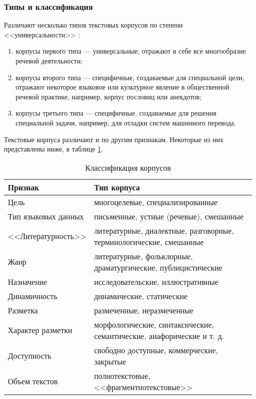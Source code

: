 \subsubsection{Типы и классификация}

Различают несколько типов текстовых корпусов по степени <<универсальности>> \cite{kl}:
\begin{enumerate}
    \item корпусы первого типа --- универсальные, отражают в себе все многообразие речевой деятельности;
    \item корпусы второго типа --- специфичные, создаваемые для специальной цели, отражают некоторое языковое или культурное явление в общественной речевой практике, например, корпус пословиц или анекдотов;
    \item корпусы третьего типа --- специфичные, создаваемые для решения специальной задачи, например, для отладки систем машинного перевода.
\end{enumerate}

Текстовые корпуса различают и по другим признакам.
Некоторые из них представлены ниже, в таблице \ref{tab:coc}.
\begin{table}[H]
\centering
        \caption{Классификация корпусов \cite[с. 16]{kl}}
		\label{tab:coc}
        \begin{adjustbox}{width=1\textwidth}
            \begin{tabular}{|p{}|p{}|}
        \hline
        Признак & Тип корпуса \\
        \hline
        \hline
        Цель & многоцелевые, специализированные \\
        \hline
        Тип языковых данных & письменные, устные (речевые), смешанные \\
        \hline
        <<Литературность>> & литературные, диалектные, разговорные, терминологические, смешанные \\
        \hline
        Жанр & литературные, фольклорные, драматургические, публицистические \\
        \hline
        Назначение & исследовательские, иллюстративные \\
        \hline
        Динамичность & динамические, статические \\
        \hline
        Разметка & размеченные, неразмеченные \\
        \hline
        Характер разметки & морфологические, синтаксические, семантические, анафорические и т. д. \\
        \hline
        Доступность & свободно доступные, коммерческие, закрытые \\
        \hline
        Объем текстов & полнотекстовые, <<фрагментнотекстовые>> \\
        \hline
		\end{tabular}
        \end{adjustbox}
\end{table}

